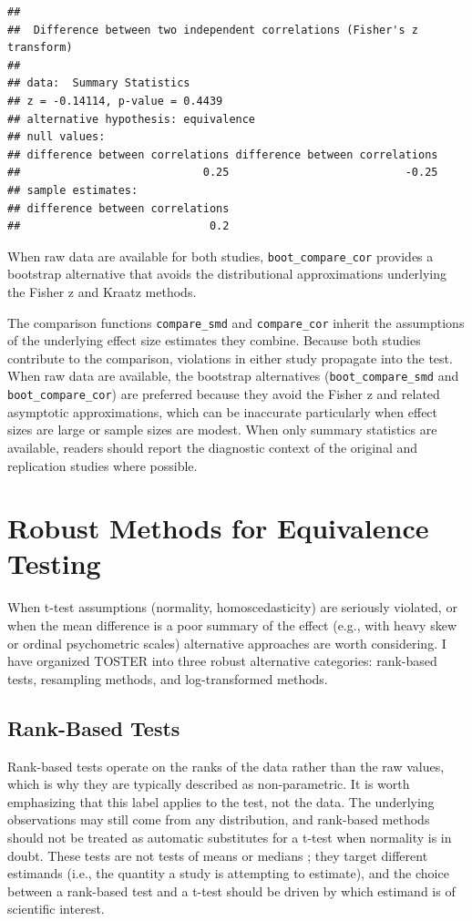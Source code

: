 \documentclass[]{interact}
\theoremstyle{plain}%
\theoremstyle{definition}
\theoremstyle{remark}
\begin{document}
\begin{verbatim}
## 
##  Difference between two independent correlations (Fisher's z transform)
## 
## data:  Summary Statistics
## z = -0.14114, p-value = 0.4439
## alternative hypothesis: equivalence
## null values:
## difference between correlations difference between correlations 
##                            0.25                           -0.25 
## sample estimates:
## difference between correlations 
##                             0.2
\end{verbatim}

When raw data are available for both studies,
\texttt{boot\_compare\_cor} provides a bootstrap alternative that avoids
the distributional approximations underlying the Fisher z and Kraatz
methods.

The comparison functions \texttt{compare\_smd} and \texttt{compare\_cor}
inherit the assumptions of the underlying effect size estimates they
combine. Because both studies contribute to the comparison, violations
in either study propagate into the test. When raw data are available,
the bootstrap alternatives (\texttt{boot\_compare\_smd} and
\texttt{boot\_compare\_cor}) are preferred because they avoid the Fisher
z and related asymptotic approximations, which can be inaccurate
particularly when effect sizes are large or sample sizes are modest.
When only summary statistics are available, readers should report the
diagnostic context of the original and replication studies where
possible.

\newpage

\section{Robust Methods for Equivalence
Testing}\label{robust-methods-for-equivalence-testing}

When t-test assumptions (normality, homoscedasticity) are seriously
violated, or when the mean difference is a poor summary of the effect
(e.g., with heavy skew or ordinal psychometric scales) alternative
approaches are worth considering. I have organized TOSTER into three
robust alternative categories: rank-based tests, resampling methods, and
log-transformed methods.

\subsection{Rank-Based Tests}\label{rank-based-tests}

Rank-based tests operate on the ranks of the data rather than the raw
values, which is why they are typically described as non-parametric. It
is worth emphasizing that this label applies to the test, not the data.
The underlying observations may still come from any distribution, and
rank-based methods should not be treated as automatic substitutes for a
t-test when normality is in doubt. These tests are not tests of means or
medians \citep{median_test, karch2021}; they target different estimands
(i.e., the quantity a study is attempting to estimate), and the choice
between a rank-based test and a t-test should be driven by which
estimand is of scientific interest.
\end{document}
